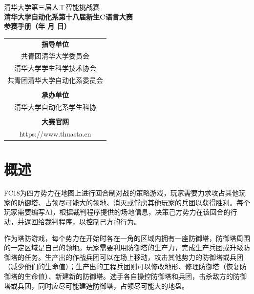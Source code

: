 \documentclass[a4paper,4pt]{article}
\renewcommand{\today}{\number\year 年 \number\month 月 \number\day 日}
\begin{document}
\begin{titlepage}
  \heiti
  \vspace*{20pt}
  \begin{center}
    \fontsize{20pt}{0} {清华大学第三届人工智能挑战赛}\\
    \vspace*{20pt}
    \fontsize{20pt}{0} \textbf{清华大学自动化系第十八届新生C语言大赛}\\
    \vspace*{20pt}
    \fontsize{20pt}{0} \textbf{参赛手册（\today）}\\
    \vspace*{280pt}
    \normalsize
    \rmfamily
    \begin{tabular}{c} %
      \textbf{指导单位}            \\
      共青团清华大学委员会         \\
      清华大学学生科学技术协会     \\
      共青团清华大学自动化系委员会 \\
      \\
      \textbf{承办单位}            \\
      清华大学自动化系学生科协     \\
      \\
      \textbf{大赛官网}            \\
      https://www.thuasta.cn       \\
    \end{tabular}
  \end{center}
\end{titlepage}


\tableofcontents%
\newpage%
\section{概述}
FC18为四方势力在地图上进行回合制对战的策略游戏，玩家需要力求攻占其他玩家的防御塔、占领尽可能大的领地、消灭或俘虏其他玩家的兵团以获得胜利。每个玩家需要编写AI，根据裁判程序提供的场地信息，决策己方势力在该回合的行动，并返回给裁判程序，以控制己方的行为。\par
作为塔防游戏，每个势力在开始时各在一角的区域内拥有一座防御塔，防御塔周围的一定区域是自己的领地。玩家需要利用防御塔的生产力，完成生产兵团或升级防御塔的任务。生产出的作战兵团可以在场上移动，攻击其他势力的防御塔或兵团（减少他们的生命值）；生产出的工程兵团则可以修改地形、修理防御塔（恢复防御塔的生命值）、新建新的防御塔。选手各自操控防御塔和兵团，击杀敌方的防御塔或兵团，同时应尽可能建造防御塔，占领尽可能大的地盘。\par
\end{document}
